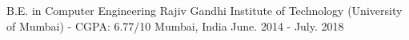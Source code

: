 

\begin{cventries}

  \cventry
    {B.E. in Computer Engineering} %
    {Rajiv Gandhi Institute of Technology (University of Mumbai) - CGPA: 6.77/10} %
    {Mumbai, India} %
    {June. 2014 - July. 2018} %
    {}

\end{cventries}

